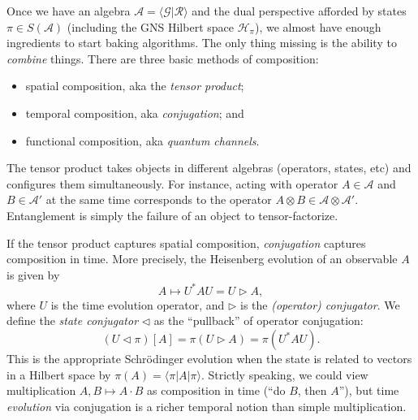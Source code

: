 Once we have an algebra $\mathcal{A} = \langle
\mathcal{G}|\mathcal{R}\rangle$ and the dual perspective afforded by
states $\pi \in S(\mathcal{A})$ (including the GNS Hilbert space
$\mathcal{H}_\pi$), we almost have enough ingredients to start baking algorithms.
The only thing missing is the ability to \emph{combine} things.
There are three basic methods of composition: %
\begin{itemize}[itemsep=-1pt]
\item spatial composition, aka the \emph{tensor product};
\item temporal composition, aka \emph{conjugation}; and
\item functional composition, aka \emph{quantum channels}.
\end{itemize}
The tensor product takes objects in different algebras (operators,
states, etc) and configures them simultaneously. For instance, acting with
operator $A \in \mathcal{A}$ and $B \in \mathcal{A}'$ at the same time
corresponds to the operator $A \otimes B \in \mathcal{A} \otimes
\mathcal{A}'$. Entanglement is simply the failure of an object to
tensor-factorize.

If the tensor product captures spatial composition, \emph{conjugation}
captures composition in time.
More precisely, the Heisenberg evolution of an observable $A$ is given
by
\[
  A \mapsto U^* A U = U \triangleright A,
\]
where $U$ is the time evolution operator, and $\triangleright$ is the \emph{(operator)
  conjugator}.
We define the \emph{state conjugator} $\triangleleft$ as the
``pullback'' of operator conjugation:
\[
( U \triangleleft \pi) [A] = \pi( U \triangleright A) = \pi (U^*AU).
\]
This is the appropriate Schr\"{o}dinger evolution when the state is
related to vectors in a Hilbert space by $\pi(A) = \langle \pi |A
|\pi\rangle$.
Strictly speaking, we could view multiplication $A, B \mapsto A \cdot
B$ as composition in time (``do $B$, then $A$''), but time \emph{evolution} via conjugation
is a richer temporal notion than simple multiplication.

